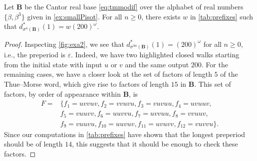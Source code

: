 \documentclass[12pt,reqno]{amsart}
\newcommand{\B}{{\mathbf{B}}}
\begin{document}
\begin{lemma}
\label{lem:finitepref}
    Let $\B$ be the Cantor real base \eqref{eq:tmmodif} over the alphabet of real numbers $\{\beta,\beta^3\}$ given in \cref{ex:smallPisot}. For all $n\ge 0$, there exists $w$ in \cref{tab:prefixes} such that $d_{\sigma^n(\B)}^*(1)=w(200)^{\omega}$. 
\end{lemma}

\begin{proof}
Inspecting \cref{fig:exa2}, we see that $d_{\sigma^{3n}(\B)}^{*}(1)=(200)^{\omega}$ for all $n\ge 0$, i.e., the preperiod is $\varepsilon$. Indeed, we have two highlighted closed walks starting from the initial state with input $u$ or $v$ and the same output $200$. For the remaining cases, we have a closer look at the set of factors of length $5$ of the Thue--Morse word, which give rise to factors of length $15$ in $\B$. This set of factors, by order of appearance within $\mathbf{B}$, is  
\begin{align*} 
F=&\{f_1=uvvuv,f_2=vvuvu,f_3=vuvuu,f_4=uvuuv,\\ 
    & f_5=vuuvv,f_6=uuvvu,f_7=uvvuu,f_8=vvuuv, \\
    & f_9=vuuvu,f_{10}=uuvuv,f_{11}=uvuvv,f_{12}=vuvvu\}.
\end{align*} 
Since our computations in \cref{tab:prefixes} have shown that the longest preperiod should be of length $14$, this suggests that it should be enough to check these factors.


\end{proof}
\end{document}
